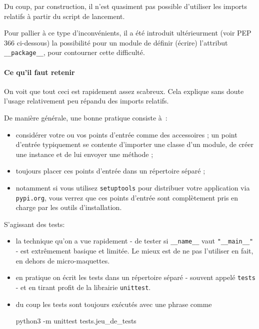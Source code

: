     Du coup, par construction, il n'est quasiment pas possible d'utiliser
les imports relatifs à partir du script de lancement.

Pour pallier à ce type d'inconvénients, il a été introduit ultérieurment
(voir PEP 366 ci-dessous) la possibilité pour un module de définir
(écrire) l'attribut \texttt{\_\_package\_\_}, pour contourner cette
difficulté.

    \hypertarget{ce-quil-faut-retenir}{%
\paragraph{Ce qu'il faut retenir}\label{ce-quil-faut-retenir}}

    On voit que tout ceci est rapidement assez scabreux. Cela explique sans
doute l'usage relativement peu répandu des imports relatifs.

De manière générale, une bonne pratique consiste à~:

\begin{itemize}
\tightlist
\item
  considérer votre ou vos points d'entrée comme des accessoires ; un
  point d'entrée typiquement se contente d'importer une classe d'un
  module, de créer une instance et de lui envoyer une méthode ;
\item
  toujours placer ces points d'entrée dans un répertoire séparé ;
\item
  notamment si vous utilisez \texttt{setuptools} pour distribuer votre
  application via \texttt{pypi.org}, vous verrez que ces points d'entrée
  sont complètement pris en charge par les outils d'installation.
\end{itemize}

S'agissant des tests:

\begin{itemize}
\item
  la technique qu'on a vue rapidement - de tester si
  \texttt{\_\_name\_\_} vaut \texttt{"\_\_main\_\_"} - est extrêmement
  basique et limitée. Le mieux est de ne pas l'utiliser en fait, en
  dehors de micro-maquettes.
\item
  en pratique on écrit les tests dans un répertoire séparé - souvent
  appelé \texttt{tests} - et en tirant profit de la librairie
  \texttt{unittest}.
\item
  du coup les tests sont toujours exécutés avec une phrase comme

  python3 -m unittest tests.jeu\_de\_tests
\end{itemize}

